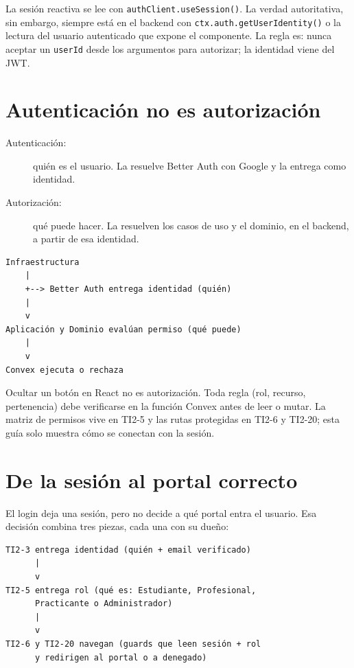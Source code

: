\documentclass[11pt,a4paper]{article}
\begin{document}
La sesión reactiva se lee con \texttt{authClient.useSession()}. La verdad
autoritativa, sin embargo, siempre está en el backend con
\texttt{ctx.auth.getUserIdentity()} o la lectura del usuario autenticado que
expone el componente. La regla es: nunca aceptar un \texttt{userId} desde los
argumentos para autorizar; la identidad viene del JWT.

\section{Autenticación no es autorización}

\begin{description}
  \item[Autenticación:] quién es el usuario. La resuelve Better Auth con
    Google y la entrega como identidad.
  \item[Autorización:] qué puede hacer. La resuelven los casos de uso y el
    dominio, en el backend, a partir de esa identidad.
\end{description}

\begin{lstlisting}
Infraestructura
    |
    +--> Better Auth entrega identidad (quién)
    |
    v
Aplicación y Dominio evalúan permiso (qué puede)
    |
    v
Convex ejecuta o rechaza
\end{lstlisting}

Ocultar un botón en React no es autorización. Toda regla (rol, recurso,
pertenencia) debe verificarse en la función Convex antes de leer o mutar.
La matriz de permisos vive en TI2-5 y las rutas protegidas en TI2-6 y TI2-20;
esta guía solo muestra cómo se conectan con la sesión.

\section{De la sesión al portal correcto}

El login deja una sesión, pero no decide a qué portal entra el usuario. Esa
decisión combina tres piezas, cada una con su dueño:

\begin{lstlisting}
TI2-3 entrega identidad (quién + email verificado)
      |
      v
TI2-5 entrega rol (qué es: Estudiante, Profesional,
      Practicante o Administrador)
      |
      v
TI2-6 y TI2-20 navegan (guards que leen sesión + rol
      y redirigen al portal o a denegado)
\end{lstlisting}
\end{document}
